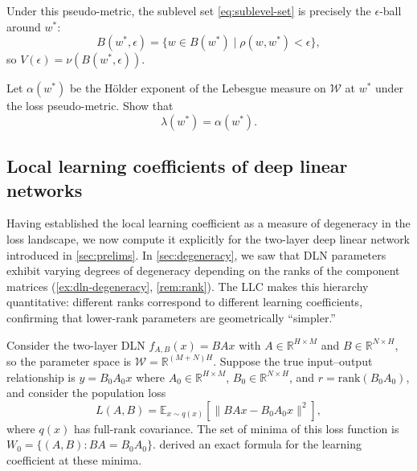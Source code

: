 \documentclass[11pt]{article}
\newcommand{\R}{\mathbb{R}}
\newcommand{\E}{\mathbb{E}}
\newcommand{\rank}{\mathrm{rank}}
\newcommand{\W}{\mathcal{W}}
\begin{document}
Under this pseudo-metric, the sublevel set \eqref{eq:sublevel-set} is precisely the $\epsilon$-ball around $w^*$:
\begin{equation}
    B(w^*, \epsilon) = \{ w \in B(w^*) \mid \rho(w, w^*) < \epsilon \},
\end{equation}
so $V(\epsilon) = \nu(B(w^*, \epsilon))$.

\begin{exercise} \label{ex:holder-llc}
    Let $\alpha(w^*)$ be the Hölder exponent of the Lebesgue measure on $\W$ at $w^*$ under the loss pseudo-metric. Show that
    \begin{equation*}
        \lambda(w^*) = \alpha(w^*).
    \end{equation*}
\end{exercise}

\subsection{Local learning coefficients of deep linear networks}
\label{sec:llc:dln}

Having established the local learning coefficient as a measure of degeneracy
in the loss landscape, we now compute it explicitly for the two-layer deep
linear network introduced in \cref{sec:prelims}. In \cref{sec:degeneracy},
we saw that DLN parameters exhibit varying degrees of degeneracy depending
on the ranks of the component matrices (\cref{ex:dln-degeneracy},
\cref{rem:rank}). The LLC makes this hierarchy quantitative: different
ranks correspond to different learning coefficients, confirming that
lower-rank parameters are geometrically ``simpler.''

Consider the two-layer DLN $f_{A,B}(x) = BAx$ with
$A \in \R^{H \times M}$ and $B \in \R^{N \times H}$, so the parameter
space is $\W = \R^{(M+N)H}$. Suppose the true input--output relationship
is $y = B_0 A_0 x$ where $A_0 \in \R^{H \times M}$,
$B_0 \in \R^{N \times H}$, and $r = \rank(B_0 A_0)$, and consider the
population loss
\begin{equation}
    L(A, B) = \E_{x \sim q(x)}\!\left[\|BAx - B_0 A_0 x\|^2\right],
\end{equation}
where $q(x)$ has full-rank covariance. The set of minima of this loss function is
$W_0 = \{(A, B) : BA = B_0 A_0\}$.
\citet{Aoyagi+Watanabe2005} derived an exact formula for the learning
coefficient at these minima.
\end{document}
